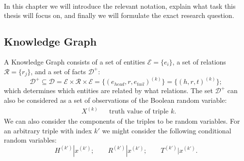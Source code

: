 
\paragraph{}\noindent
In this chapter we will introduce the relevant notation, explain what task this thesis will focus on, and finally we will formulate the exact research question.

\subsection*{Knowledge Graph}
%
% 
A Knowledge Graph consists of a set of entities $\mathcal{E} = \{ e_{i} \}$, a set of relations $\mathcal{R} = \{ r_{j} \}$, and a set of facts $\mathcal{D}^+$:
\begin{equation}
    \mathcal{D}^+ \subseteq \mathcal{D} = \mathcal{E} \times \mathcal{R} \times \mathcal{E} =  \{ (e_{head}, r, e_{tail})^{(k)} \} = \{ (h, r, t)^{(k)} \};
\end{equation}
which determines which entities are related by what relations. 
The set $\mathcal{D}^+$ can also be considered as a set of observations of the Boolean random variable:
\begin{align}
    & X^{(k)} & &\text{truth value of triple $k$.} 
\end{align}
%
We can also consider the components of the triples to be random variables. For an arbitrary triple with index $k'$ we might consider the following conditional random variables:
\begin{equation} \label{eq:ex_cond_rv1}
    H^{(k')} | x^{(k')}; \hspace{2em} R^{(k')} | x^{(k')}; \hspace{2em} T^{(k')} | x^{(k')} .
\end{equation}
